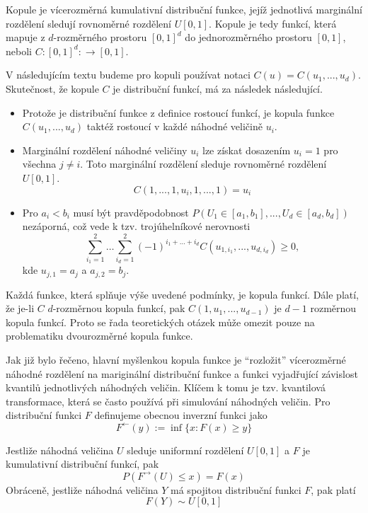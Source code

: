 \begin{definition}[Kopule]
Kopule je vícerozměrná kumulativní distribuční funkce, jejíž jednotlivá marginální rozdělení sledují rovnoměrné rozdělení $U[0, 1]$. Kopule je tedy funkcí, která mapuje z $d$-rozměrného prostoru $[0, 1]^d$ do jednorozměrného prostoru $[0, 1]$, neboli $C : [0, 1]^d : \rightarrow [0, 1]$.
\end{definition}
V následujícím textu budeme pro kopuli používat notaci $C(u) = C(u_1, ..., u_d)$. Skutečnost, že kopule $C$ je distribuční funkcí, má za následek následující.
\begin{itemize}
\item Protože je distribuční funkce z definice rostoucí funkcí, je kopula funkce $C(u_1, ..., u_d)$ taktéž rostoucí v každé náhodné veličině $u_i$.
\item Marginální rozdělení náhodné veličiny $u_i$ lze získat dosazením $u_i = 1$ pro všechna $j \neq i$. Toto marginální rozdělení sleduje rovnoměrné rozdělení $U[0, 1]$.
\begin{equation*}
C(1, ..., 1, u_i, 1, ..., 1) = u_i
\end{equation*}
\item Pro $a_i < b_i$ musí být pravděpodobnost $P(U_1 \in [a_1, b_1], ..., U_d \in [a_d, b_d])$ nezáporná, což vede k tzv. trojúhelníkové nerovnosti
\begin{equation*}
\sum_{i_1 = 1}^2 \dots \sum_{i_d = 1}^2 (-1)^{i_1 + \dots + i_d}C(u_{1, i_1}, ..., u_{d, i_d}) \ge 0,
\end{equation*}
kde $u_{j,1} = a_j$ a $a_{j,2} = b_j$.
\end{itemize}
Každá funkce, která splňuje výše uvedené podmínky, je kopula funkcí. Dále platí, že je-li $C$ $d$-rozměrnou kopula funkcí, pak $C(1, u_1, ..., u_{d-1})$ je $d-1$ rozměrnou kopula funkcí. Proto se řada teoretických otázek může omezit pouze na problematiku dvourozměrné kopula funkce.

Jak již bylo řečeno, hlavní myšlenkou kopula funkce je ``rozložit'' vícerozměrné náhodné rozdělení na mariginální distribuční funkce a funkci vyjadřující závislost kvantilů jednotlivých náhodných veličin. Klíčem k tomu je tzv. kvantilová transformace, která se často používá při simulování náhodných veličin. Pro distribuční funkci $F$ definujeme obecnou inverzní funkci jako
\begin{equation*}
F^{\leftarrow}(y) := \inf\{x: F(x) \ge y\}
\end{equation*}
\begin{proposition}
Jestliže náhodná veličina $U$ sleduje uniformní rozdělení $U[0, 1]$ a $F$ je kumulativní distribuční funkcí, pak
\begin{equation}
P(F^{\rightarrow}(U) \le x) = F(x)
\end{equation}
Obráceně, jestliže náhodná veličina $Y$ má spojitou distribuční funkci $F$, pak platí
\begin{equation}
F(Y) \sim U[0, 1]
\end{equation}
\end{proposition}

